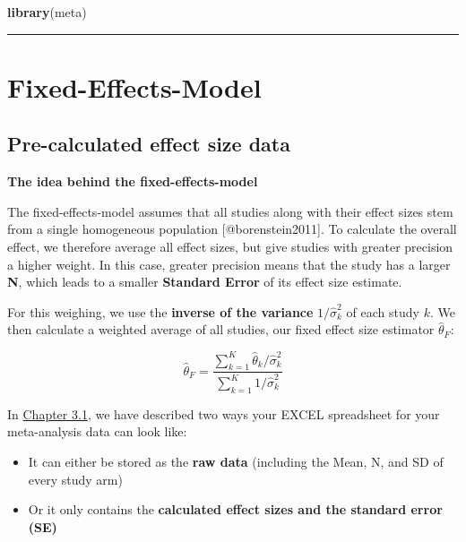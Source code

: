 \documentclass[]{book}
\newenvironment{Shaded}{\begin{snugshade}}{\end{snugshade}}
\newcommand{\KeywordTok}[1]{\textcolor[rgb]{0.13,0.29,0.53}{\textbf{#1}}}
\newcommand{\NormalTok}[1]{#1}
\providecommand{\tightlist}{%
  \setlength{\itemsep}{0pt}\setlength{\parskip}{0pt}}
\theoremstyle{definition}
\theoremstyle{definition}
\theoremstyle{definition}
\theoremstyle{remark}
\begin{document}
\begin{Shaded}
\begin{Highlighting}[]
\KeywordTok{library}\NormalTok{(meta)}
\end{Highlighting}
\end{Shaded}

\begin{center}\rule{0.5\linewidth}{\linethickness}\end{center}

\hypertarget{fixed}{\section{Fixed-Effects-Model}\label{fixed}}

\hypertarget{pre.calc}{\subsection{Pre-calculated effect size
data}\label{pre.calc}}

\begin{rmdinfo}
\textbf{The idea behind the fixed-effects-model}

The fixed-effects-model assumes that all studies along with their effect
sizes stem from a single homogeneous population {[}@borenstein2011{]}.
To calculate the overall effect, we therefore average all effect sizes,
but give studies with greater precision a higher weight. In this case,
greater precision means that the study has a larger \textbf{N}, which
leads to a smaller \textbf{Standard Error} of its effect size estimate.

For this weighing, we use the \textbf{inverse of the variance}
\(1/\hat\sigma^2_k\) of each study \(k\). We then calculate a weighted
average of all studies, our fixed effect size estimator
\(\hat\theta_F\):
\end{rmdinfo}

\begin{equation}
\hat\theta_F = \frac{\sum\limits_{k=1}^K \hat\theta_k/ \hat\sigma^2_k}{\sum\limits_{k=1}^K 1/\hat\sigma^2_k}
\end{equation}

In \protect\hyperlink{excel_preparation}{Chapter 3.1}, we have described
two ways your EXCEL spreadsheet for your meta-analysis data can look
like:

\begin{itemize}
\tightlist
\item
  It can either be stored as the \textbf{raw data} (including the Mean,
  N, and SD of every study arm)
\item
  Or it only contains the \textbf{calculated effect sizes and the
  standard error (SE)}
\end{itemize}
\end{document}
